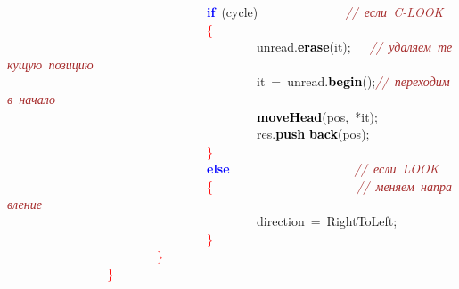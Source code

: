 \mbox{}\ \ \ \ \ \ \ \ \ \ \ \ \ \ \ \ \ \ \ \ \ \ \ \ \ \ \ \ \ \ \ \ \textbf{\textcolor{Blue}{if}}\ \textcolor{BrickRed}{(}cycle\textcolor{BrickRed}{)}\ \ \ \ \ \ \ \ \ \ \ \ \ \ \textit{\textcolor{Brown}{//\ если\ C-LOOK}} \\
\mbox{}\ \ \ \ \ \ \ \ \ \ \ \ \ \ \ \ \ \ \ \ \ \ \ \ \ \ \ \ \ \ \ \ \textcolor{Red}{\{} \\
\mbox{}\ \ \ \ \ \ \ \ \ \ \ \ \ \ \ \ \ \ \ \ \ \ \ \ \ \ \ \ \ \ \ \ \ \ \ \ \ \ \ \ unread\textcolor{BrickRed}{.}\textbf{\textcolor{Black}{erase}}\textcolor{BrickRed}{(}it\textcolor{BrickRed}{);}\ \ \ \textit{\textcolor{Brown}{//\ удаляем\ текущую\ позицию}} \\
\mbox{}\ \ \ \ \ \ \ \ \ \ \ \ \ \ \ \ \ \ \ \ \ \ \ \ \ \ \ \ \ \ \ \ \ \ \ \ \ \ \ \ it\ \textcolor{BrickRed}{=}\ unread\textcolor{BrickRed}{.}\textbf{\textcolor{Black}{begin}}\textcolor{BrickRed}{();}\textit{\textcolor{Brown}{//\ переходим\ в\ начало}} \\
\mbox{}\ \ \ \ \ \ \ \ \ \ \ \ \ \ \ \ \ \ \ \ \ \ \ \ \ \ \ \ \ \ \ \ \ \ \ \ \ \ \ \ \textbf{\textcolor{Black}{moveHead}}\textcolor{BrickRed}{(}pos\textcolor{BrickRed}{,}\ \textcolor{BrickRed}{*}it\textcolor{BrickRed}{);} \\
\mbox{}\ \ \ \ \ \ \ \ \ \ \ \ \ \ \ \ \ \ \ \ \ \ \ \ \ \ \ \ \ \ \ \ \ \ \ \ \ \ \ \ res\textcolor{BrickRed}{.}\textbf{\textcolor{Black}{push$\_$back}}\textcolor{BrickRed}{(}pos\textcolor{BrickRed}{);} \\
\mbox{}\ \ \ \ \ \ \ \ \ \ \ \ \ \ \ \ \ \ \ \ \ \ \ \ \ \ \ \ \ \ \ \ \textcolor{Red}{\}} \\
\mbox{}\ \ \ \ \ \ \ \ \ \ \ \ \ \ \ \ \ \ \ \ \ \ \ \ \ \ \ \ \ \ \ \ \textbf{\textcolor{Blue}{else}}\ \ \ \ \ \ \ \ \ \ \ \ \ \ \ \ \ \ \ \ \textit{\textcolor{Brown}{//\ если\ LOOK}} \\
\mbox{}\ \ \ \ \ \ \ \ \ \ \ \ \ \ \ \ \ \ \ \ \ \ \ \ \ \ \ \ \ \ \ \ \textcolor{Red}{\{}\ \ \ \ \ \ \ \ \ \ \ \ \ \ \ \ \ \ \ \ \ \ \ \textit{\textcolor{Brown}{//\ меняем\ направление}} \\
\mbox{}\ \ \ \ \ \ \ \ \ \ \ \ \ \ \ \ \ \ \ \ \ \ \ \ \ \ \ \ \ \ \ \ \ \ \ \ \ \ \ \ direction\ \textcolor{BrickRed}{=}\ RightToLeft\textcolor{BrickRed}{;} \\
\mbox{}\ \ \ \ \ \ \ \ \ \ \ \ \ \ \ \ \ \ \ \ \ \ \ \ \ \ \ \ \ \ \ \ \textcolor{Red}{\}} \\
\mbox{}\ \ \ \ \ \ \ \ \ \ \ \ \ \ \ \ \ \ \ \ \ \ \ \ \textcolor{Red}{\}} \\
\mbox{}\ \ \ \ \ \ \ \ \ \ \ \ \ \ \ \ \textcolor{Red}{\}} \\
